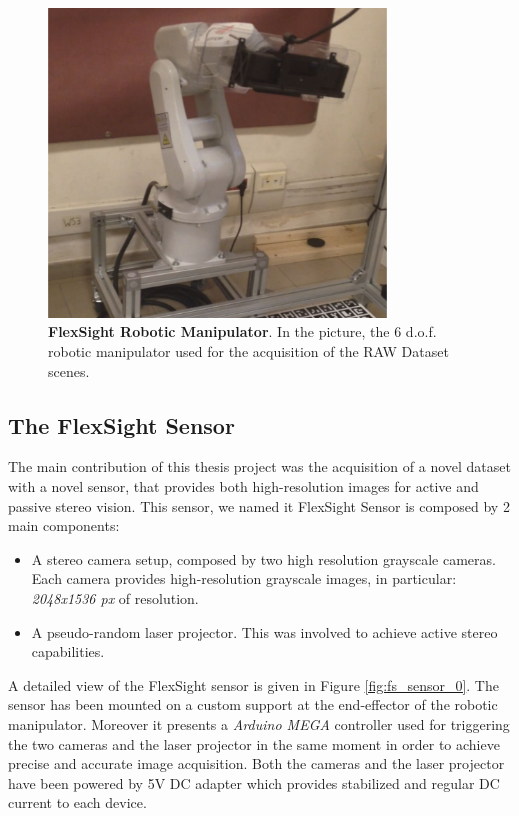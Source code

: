 \begin{figure}
    \centering
    \includegraphics[width=0.8\textwidth]{figures/3_raw_dataset/raw_robot_example}
    \caption{\textbf{FlexSight Robotic Manipulator}. In the picture, the 6 d.o.f. robotic manipulator used for the acquisition of the RAW Dataset scenes.}
    \label{fig:raw_robot_example}
\end{figure}

\subsection{The FlexSight Sensor}\label{subsec:raw_setup_fss}
The main contribution of this thesis project was the acquisition of a novel dataset with a novel sensor, that provides both high-resolution images for active and passive stereo vision. This sensor, we named it FlexSight Sensor is composed by 2 main components:

\begin{itemize}
	\item A stereo camera setup, composed by two high resolution grayscale cameras. Each camera provides high-resolution grayscale images, in particular: \emph{2048x1536 px} of resolution.
	\item A pseudo-random laser projector. This was involved to achieve active stereo capabilities.
\end{itemize}

A detailed view of the FlexSight sensor is given in Figure \ref{fig:fs_sensor_0}. The sensor has been mounted on a custom support at the end-effector of the robotic manipulator. Moreover it presents a \emph{Arduino MEGA} controller used for triggering the two cameras and the laser projector in the same moment in order to achieve precise and accurate image acquisition. Both the cameras and the laser projector have been powered by 5V DC adapter which provides stabilized and regular DC current to each device.

